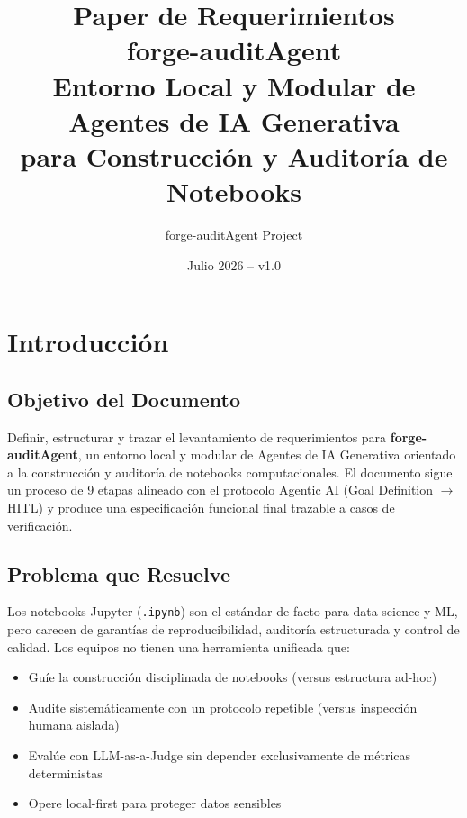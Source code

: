 \documentclass[12pt,a4paper]{article}
\title{\Huge\textbf{Paper de Requerimientos}\\[6pt]
       \Large\textbf{forge-auditAgent}\\[12pt]
       \large Entorno Local y Modular de Agentes de IA Generativa\\
       para Construcción y Auditoría de Notebooks}
\author{forge-auditAgent Project}
\date{Julio 2026 -- v1.0}
\begin{document}

\maketitle
\thispagestyle{empty}
\newpage

\tableofcontents
\newpage

\section{Introducción}

\subsection{Objetivo del Documento}
\label{sec:objetivo}

Definir, estructurar y trazar el levantamiento de requerimientos para \textbf{forge-auditAgent}, un entorno local y modular de Agentes de IA Generativa orientado a la construcción y auditoría de notebooks computacionales. El documento sigue un proceso de 9 etapas alineado con el protocolo Agentic AI (Goal Definition $\rightarrow$ HITL) y produce una especificación funcional final trazable a casos de verificación.

\subsection{Problema que Resuelve}
\label{sec:problema}

Los notebooks Jupyter (\texttt{.ipynb}) son el estándar de facto para data science y ML, pero carecen de garantías de reproducibilidad, auditoría estructurada y control de calidad. Los equipos no tienen una herramienta unificada que:
\begin{itemize}
  \item Guíe la construcción disciplinada de notebooks (versus estructura ad-hoc)
  \item Audite sistemáticamente con un protocolo repetible (versus inspección humana aislada)
  \item Evalúe con LLM-as-a-Judge sin depender exclusivamente de métricas deterministas
  \item Opere local-first para proteger datos sensibles
\end{itemize}
\end{document}
